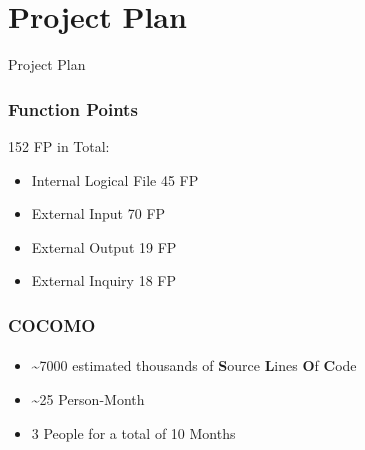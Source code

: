 \documentclass[10pt,xcolor={usenames,dvipsnames}]{beamer}
\begin{document}
\section[Section]{Project Plan}
\begin{frame}
	\begin{center}
		Project Plan
	\end{center}
\end{frame}
\begin{frame}
	\frametitle{Function Points}
	152 FP in Total:
	\begin{itemize}
		\item Internal Logical File 45 FP
		\item External Input 70 FP
		\item External Output 19 FP
		\item External Inquiry 18 FP
	\end{itemize}
\end{frame}
\begin{frame}
	\frametitle{COCOMO}
	\framesubtitle{}
	\begin{itemize}
		\item \textasciitilde7000 estimated thousands of \textbf{S}ource \textbf{L}ines \textbf{O}f \textbf{C}ode
		\item \textasciitilde25 Person-Month
		\item 3 People for a total of 10 Months
	\end{itemize}
\end{frame}
\end{document}
